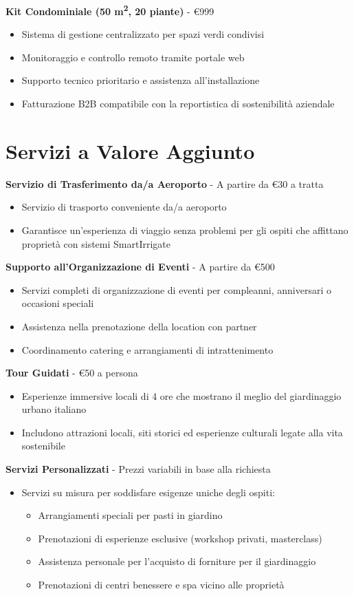 \documentclass[11pt,a4paper]{report}
\begin{document}
\textbf{Kit Condominiale (50 m\textsuperscript{2}, 20 piante)} - €999
\begin{itemize}
    \item Sistema di gestione centralizzato per spazi verdi condivisi
    \item Monitoraggio e controllo remoto tramite portale web
    \item Supporto tecnico prioritario e assistenza all'installazione
    \item Fatturazione B2B compatibile con la reportistica di sostenibilità aziendale
\end{itemize}

\section{Servizi a Valore Aggiunto}

\textbf{Servizio di Trasferimento da/a Aeroporto} - A partire da €30 a tratta
\begin{itemize}
    \item Servizio di trasporto conveniente da/a aeroporto
    \item Garantisce un'esperienza di viaggio senza problemi per gli ospiti che affittano proprietà con sistemi SmartIrrigate
\end{itemize}

\textbf{Supporto all'Organizzazione di Eventi} - A partire da €500
\begin{itemize}
    \item Servizi completi di organizzazione di eventi per compleanni, anniversari o occasioni speciali
    \item Assistenza nella prenotazione della location con partner
    \item Coordinamento catering e arrangiamenti di intrattenimento
\end{itemize}

\textbf{Tour Guidati} - €50 a persona
\begin{itemize}
    \item Esperienze immersive locali di 4 ore che mostrano il meglio del giardinaggio urbano italiano
    \item Includono attrazioni locali, siti storici ed esperienze culturali legate alla vita sostenibile
\end{itemize}

\textbf{Servizi Personalizzati} - Prezzi variabili in base alla richiesta
\begin{itemize}
    \item Servizi su misura per soddisfare esigenze uniche degli ospiti:
    \begin{itemize}
        \item Arrangiamenti speciali per pasti in giardino
        \item Prenotazioni di esperienze esclusive (workshop privati, masterclass)
        \item Assistenza personale per l'acquisto di forniture per il giardinaggio
        \item Prenotazioni di centri benessere e spa vicino alle proprietà
    \end{itemize}
\end{itemize}
\end{document}
